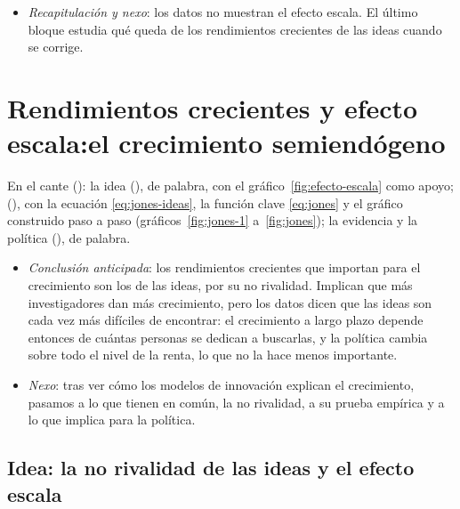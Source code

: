 \documentclass[11pt]{article}
\begin{document}
\begin{itemize}
\item \emph{Recapitulación y nexo}: los datos no muestran el efecto escala. El último bloque estudia qué queda de los rendimientos crecientes de las ideas cuando se corrige.
\end{itemize}

\section{Rendimientos crecientes y efecto escala:\newline el crecimiento semiendógeno}\label{sec:semiendogeno}

\begin{notaopositor}
En el cante (): la idea (), de palabra, con el gráfico~\ref{fig:efecto-escala} como apoyo;  (), con la ecuación \eqref{eq:jones-ideas}, la función clave \eqref{eq:jones} y el gráfico construido paso a paso (gráficos~\ref{fig:jones-1} a~\ref{fig:jones}); la evidencia y la política (), de palabra.
\end{notaopositor}

\begin{itemize}
\item \emph{Conclusión anticipada}: los rendimientos crecientes que importan para el crecimiento son los de las ideas, por su no rivalidad. Implican que más investigadores dan más crecimiento, pero los datos dicen que las ideas son cada vez más difíciles de encontrar: el crecimiento a largo plazo depende entonces de cuántas personas se dedican a buscarlas, y la política cambia sobre todo el nivel de la renta, lo que no la hace menos importante.
\item \emph{Nexo}: tras ver cómo los modelos de innovación explican el crecimiento, pasamos a lo que tienen en común, la no rivalidad, a su prueba empírica y a lo que implica para la política.
\end{itemize}

\subsection{Idea: la no rivalidad de las ideas y el efecto escala}\label{sec:escala}
\end{document}
